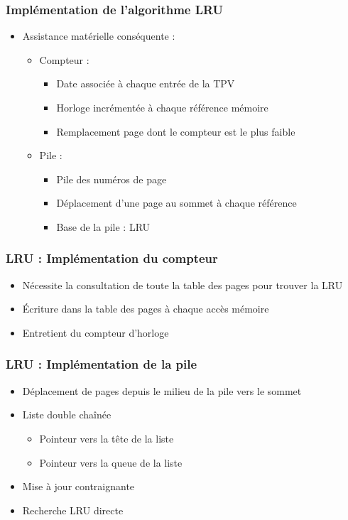 \begin{frame}
\frametitle{Implémentation de l'algorithme LRU}
\begin{itemize}
\item Assistance matérielle conséquente :
\begin{itemize}
\item Compteur :
\begin{itemize}
\item Date associée à chaque entrée de la TPV
\item Horloge incrémentée à chaque référence mémoire
\item Remplacement page dont le compteur est le plus faible 
\end{itemize}
\item Pile :
\begin{itemize}
\item Pile des numéros de page
\item Déplacement d'une page au sommet à chaque référence
\item Base de la pile : LRU
\end{itemize}
\end{itemize}
\end{itemize}
\end{frame}


\begin{frame}
\frametitle{LRU : Implémentation du compteur}
\begin{itemize}
\item Nécessite la consultation de toute la table des pages pour trouver la LRU
\item Écriture dans la table des pages à chaque accès mémoire
\item Entretient du compteur d'horloge
\end{itemize}
\end{frame}


\begin{frame}
\frametitle{LRU : Implémentation de la pile}
\begin{itemize}
\item Déplacement de pages depuis le milieu de la pile vers le sommet
\item Liste double chaînée
\begin{itemize}
\item Pointeur vers la tête de la liste
\item Pointeur vers la queue de la liste
\end{itemize}
\item Mise à jour contraignante
\item Recherche LRU directe
\end{itemize}
\end{frame}


